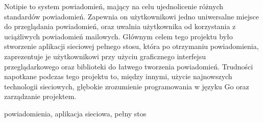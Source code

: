 \secondabstract
Notipie to system powiadomień,
mający na celu ujednolicenie
różnych standardów powiadomień.
Zapewnia on użytkownikowi
jedno uniwersalne miejsce
do przeglądania powiadomień,
oraz uwalnia użytkownika od korzystania
z uciążliwych powiadomień mailowych.
Głównym celem tego projektu
było stworzenie aplikacji sieciowej pełnego stosu,
która po otrzymaniu powiadomienia,
zaprezentuje je użytkownikowi
przy użyciu graficznego interfejsu przeglądarko\-wego
oraz biblioteki do łatwego tworzenia powiadomień.
Trudności napotkane podczas tego projektu
to, między innymi,
użycie najnowszych technologii sieciowych,
głębokie zrozumienie programowania w języku Go
oraz zarządzanie projektem.

\secondkeywords powiadomienia, aplikacja sieciowa, pełny stos
